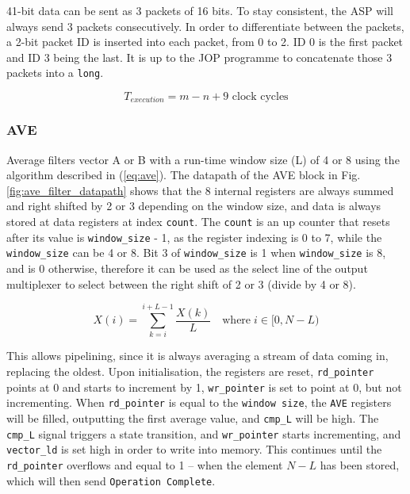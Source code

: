 \documentclass[]{article}
\begin{document}
	\par
	41-bit data can be sent as 3 packets of 16 bits. To stay consistent, the ASP will always send 3 packets consecutively. In order to differentiate between the packets, a 2-bit packet ID is inserted into each packet, from 0 to 2. ID 0 is the first packet and ID 3 being the last. It is up to the JOP programme to concatenate those 3 packets into a \texttt{long}.
	
	$$T_{execution} = m - n + 9 \text{ clock cycles}$$
	
	\subsubsection{AVE}
	Average filters vector A or B with a run-time window size (L) of 4 or 8 using the algorithm described in (\ref{eq:ave}). The datapath of the AVE block in Fig. \ref{fig:ave_filter_datapath} shows that the 8 internal registers are always summed and right shifted by 2 or 3 depending on the window size, and data is always stored at data registers at index \texttt{count}. The \texttt{count} is an up counter that resets after its value is \texttt{window\_size} - 1, as the register indexing is 0 to 7, while the \texttt{window\_size} can be 4 or 8. Bit 3 of \texttt{window\_size} is 1 when \texttt{window\_size} is 8, and is 0 otherwise, therefore it can be used as the select line of the output multiplexer to select between the right shift of 2 or 3 (divide by 4 or 8).
	
	\begin{equation} \label{eq:ave}
	X(i) = \sum_{k = i}^{i+L-1} \frac{X(k)}{L} \quad \text{where} \; i \in [0,N-L)
	\end{equation}    
	
	This allows pipelining, since it is always averaging a stream of data coming in, replacing the oldest. Upon initialisation, the registers are reset, \texttt{rd\_pointer} points at 0 and starts to increment by 1, \texttt{wr\_pointer} is set to point at 0, but not incrementing. When \texttt{rd\_pointer} is equal to the \texttt{window size}, the \texttt{AVE} registers will be filled, outputting the first average value, and \texttt{cmp\_L} will be high. The \texttt{cmp\_L} signal triggers a state transition, and \texttt{wr\_pointer} starts incrementing, and \texttt{vector\_ld} is set high in order to write into memory. This continues until the \texttt{rd\_pointer} overflows and equal to 1 -- when the element $N-L$ has been stored, which will then send \texttt{Operation Complete}.
	
\end{document}
